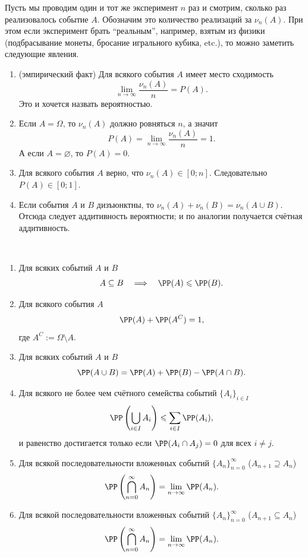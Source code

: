 \documentclass[12pt,a4paper]{article}
\begin{document}
    \begin{remark*}
        Пусть мы проводим один и тот же эксперимент $n$ раз и смотрим, сколько раз реализовалось событие $A$. Обозначим это количество реализаций за $\nu_n(A)$. При этом если эксперимент брать ``реальным'', например, взятым из физики (подбрасывание монеты, бросание игрального кубика, etc.), то можно заметить следующие явления.
        \begin{enumerate}
            \item (эмпирический факт) Для всякого события $A$ имеет место сходимость
                \[\lim_{n \to \infty} \frac{\nu_n(A)}{n} = P(A).\]
                Это и хочется назвать вероятностью.
            \item Если $A = \Omega$, то $\nu_n(A)$ должно ровняться $n$, а значит
                \[P(A) = \lim_{n \to \infty} \frac{\nu_n(A)}{n} = 1.\]
                А если $A = \varnothing$, то $P(A) = 0$.
            \item Для всякого события $A$ верно, что $\nu_n(A) \in [0; n]$. Следовательно $P(A) \in [0; 1]$.
            \item Если события $A$ и $B$ дизъюнктны, то $\nu_n(A) + \nu_n(B) = \nu_n(A \cup B)$. Отсюда следует аддитивность вероятности; и по аналогии получается счётная аддитивность.
        \end{enumerate}
    \end{remark*}

    \begin{lemma}\ 
        \begin{enumerate}
            \item Для всяких событий $A$ и $B$
                \[A \subseteq B \quad \Longrightarrow \quad \PP(A) \leqslant \PP(B).\]
            \item Для всякого события $A$
                \[\PP(A) + \PP(A^C) = 1,\]
                где $A^C := \Omega \setminus A$.
            \item Для всяких событий $A$ и $B$
                \[\PP(A \cup B) = \PP(A) + \PP(B) - \PP(A \cap B).\]
            \item Для всякого не более чем счётного семейства событий $\{A_i\}_{i \in I}$
                \[\PP\left(\bigcup_{i \in I} A_i\right) \leqslant \sum_{i \in I} \PP(A_i),\]
                и равенство достигается только если $\PP(A_i \cap A_j) = 0$ для всех $i \neq j$.
            \item Для всякой последовательности вложенных событий $\{A_n\}_{n=0}^\infty$ ($A_{n+1} \supseteq A_n$)
                \[\PP\left(\bigcap_{n=0}^\infty A_n\right) = \lim_{n \to \infty} \PP(A_n).\]
            \item Для всякой последовательности вложенных событий $\{A_n\}_{n=0}^\infty$ ($A_{n+1} \subseteq A_n$)
                \[\PP\left(\bigcap_{n=0}^\infty A_n\right) = \lim_{n \to \infty} \PP(A_n).\]
        \end{enumerate}
    \end{lemma}
\end{document}
